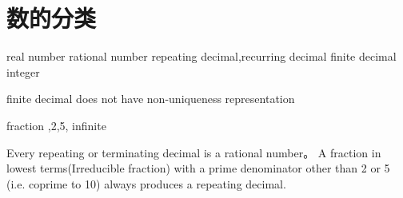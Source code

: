 \section{数的分类}
real number
rational number
repeating decimal,recurring decimal
finite decimal
integer

finite decimal does not have non-uniqueness representation

fraction ,2,5, infinite

Every repeating or terminating decimal is a rational number。
A fraction in lowest terms(Irreducible fraction) with a prime denominator other than 2 or 5 (i.e. coprime to 10) always produces a repeating decimal. 

